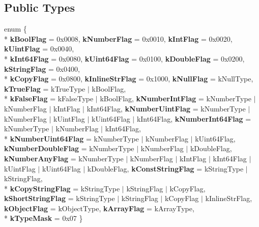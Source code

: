 \subsection*{Public Types}
\begin{DoxyCompactItemize}
\item 
enum \{ \\*
{\bfseries k\+Bool\+Flag} = 0x0008, 
{\bfseries k\+Number\+Flag} = 0x0010, 
{\bfseries k\+Int\+Flag} = 0x0020, 
{\bfseries k\+Uint\+Flag} = 0x0040, 
\\*
{\bfseries k\+Int64\+Flag} = 0x0080, 
{\bfseries k\+Uint64\+Flag} = 0x0100, 
{\bfseries k\+Double\+Flag} = 0x0200, 
{\bfseries k\+String\+Flag} = 0x0400, 
\\*
{\bfseries k\+Copy\+Flag} = 0x0800, 
{\bfseries k\+Inline\+Str\+Flag} = 0x1000, 
{\bfseries k\+Null\+Flag} = k\+Null\+Type, 
{\bfseries k\+True\+Flag} = k\+True\+Type $\vert$ k\+Bool\+Flag, 
\\*
{\bfseries k\+False\+Flag} = k\+False\+Type $\vert$ k\+Bool\+Flag, 
{\bfseries k\+Number\+Int\+Flag} = k\+Number\+Type $\vert$ k\+Number\+Flag $\vert$ k\+Int\+Flag $\vert$ k\+Int64\+Flag, 
{\bfseries k\+Number\+Uint\+Flag} = k\+Number\+Type $\vert$ k\+Number\+Flag $\vert$ k\+Uint\+Flag $\vert$ k\+Uint64\+Flag $\vert$ k\+Int64\+Flag, 
{\bfseries k\+Number\+Int64\+Flag} = k\+Number\+Type $\vert$ k\+Number\+Flag $\vert$ k\+Int64\+Flag, 
\\*
{\bfseries k\+Number\+Uint64\+Flag} = k\+Number\+Type $\vert$ k\+Number\+Flag $\vert$ k\+Uint64\+Flag, 
{\bfseries k\+Number\+Double\+Flag} = k\+Number\+Type $\vert$ k\+Number\+Flag $\vert$ k\+Double\+Flag, 
{\bfseries k\+Number\+Any\+Flag} = k\+Number\+Type $\vert$ k\+Number\+Flag $\vert$ k\+Int\+Flag $\vert$ k\+Int64\+Flag $\vert$ k\+Uint\+Flag $\vert$ k\+Uint64\+Flag $\vert$ k\+Double\+Flag, 
{\bfseries k\+Const\+String\+Flag} = k\+String\+Type $\vert$ k\+String\+Flag, 
\\*
{\bfseries k\+Copy\+String\+Flag} = k\+String\+Type $\vert$ k\+String\+Flag $\vert$ k\+Copy\+Flag, 
{\bfseries k\+Short\+String\+Flag} = k\+String\+Type $\vert$ k\+String\+Flag $\vert$ k\+Copy\+Flag $\vert$ k\+Inline\+Str\+Flag, 
{\bfseries k\+Object\+Flag} = k\+Object\+Type, 
{\bfseries k\+Array\+Flag} = k\+Array\+Type, 
\\*
{\bfseries k\+Type\+Mask} = 0x07
 \}\hypertarget{class_generic_value_aacdfd9d0f85a6161380a134e6d0c9d3c}{}\label{class_generic_value_aacdfd9d0f85a6161380a134e6d0c9d3c}


\end{DoxyCompactItemize}
